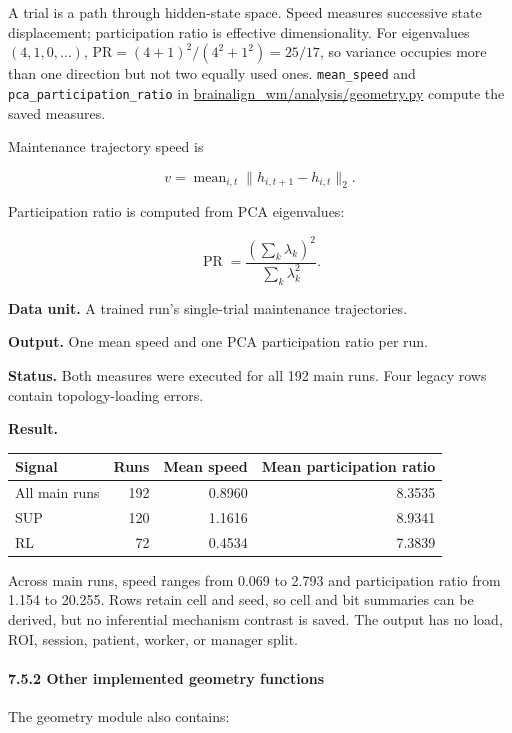 \documentclass[
  10pt,
]{article}
\begin{document}
A trial is a path through hidden-state space. Speed measures successive
state displacement; participation ratio is effective dimensionality. For
eigenvalues \((4,1,0,\ldots)\), \(\mathrm{PR}=(4+1)^2/(4^2+1^2)=25/17\),
so variance occupies more than one direction but not two equally used
ones. \texttt{mean\_speed} and \texttt{pca\_participation\_ratio} in
\url{brainalign_wm/analysis/geometry.py} compute the saved measures.

Maintenance trajectory speed is

\[
v=
\operatorname{mean}_{i,t}
\lVert h_{i,t+1}-h_{i,t}\rVert_2.
\]

Participation ratio is computed from PCA eigenvalues:

\[
\operatorname{PR}
=
\frac{(\sum_k\lambda_k)^2}{\sum_k\lambda_k^2}.
\]

\textbf{Data unit.} A trained run's single-trial maintenance
trajectories.

\textbf{Output.} One mean speed and one PCA participation ratio per run.

\textbf{Status.} Both measures were executed for all 192 main runs. Four
legacy rows contain topology-loading errors.

\textbf{Result.}

\begin{longtable}[]{@{}lrrr@{}}
\toprule\noalign{}
Signal & Runs & Mean speed & Mean participation ratio \\
\midrule\noalign{}
\endhead
\bottomrule\noalign{}
\endlastfoot
All main runs & 192 & 0.8960 & 8.3535 \\
SUP & 120 & 1.1616 & 8.9341 \\
RL & 72 & 0.4534 & 7.3839 \\
\end{longtable}

Across main runs, speed ranges from 0.069 to 2.793 and participation
ratio from 1.154 to 20.255. Rows retain cell and seed, so cell and bit
summaries can be derived, but no inferential mechanism contrast is
saved. The output has no load, ROI, session, patient, worker, or manager
split.

\hypertarget{other-implemented-geometry-functions}{%
\paragraph{7.5.2 Other implemented geometry
functions}\label{other-implemented-geometry-functions}}

The geometry module also contains:
\end{document}
